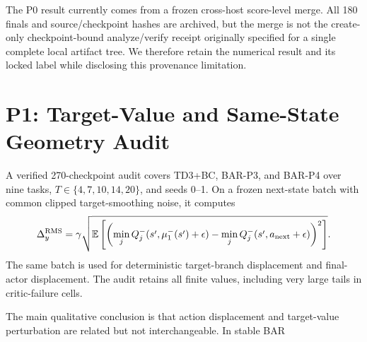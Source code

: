 \documentclass[twoside]{article}
\newcommand{\E}{\mathbb E}
\begin{document}
The P0 result currently comes from a frozen cross-host score-level merge. All 180 finals and source/checkpoint hashes are archived, but the merge is not the create-only checkpoint-bound analyze/verify receipt originally specified for a single complete local artifact tree. We therefore retain the numerical result and its locked label while disclosing this provenance limitation.

\section{P1: Target-Value and Same-State Geometry Audit}
A verified 270-checkpoint audit covers TD3+BC, BAR-P3, and BAR-P4 over nine tasks, $T\in\{4,7,10,14,20\}$, and seeds 0--1. On a frozen next-state batch with common clipped target-smoothing noise, it computes
\[
\Delta_y^{\rm RMS}=\gamma\sqrt{\E\left[\left(\min_jQ_j^-(s',\mu_1^-(s')+\epsilon)-\min_jQ_j^-(s',a_{\rm next}+\epsilon)\right)^2\right]}.
\]
The same batch is used for deterministic target-branch displacement and final-actor displacement. The audit retains all finite values, including very large tails in critic-failure cells.

The main qualitative conclusion is that action displacement and target-value perturbation are related but not interchangeable. In stable BAR
\end{document}
